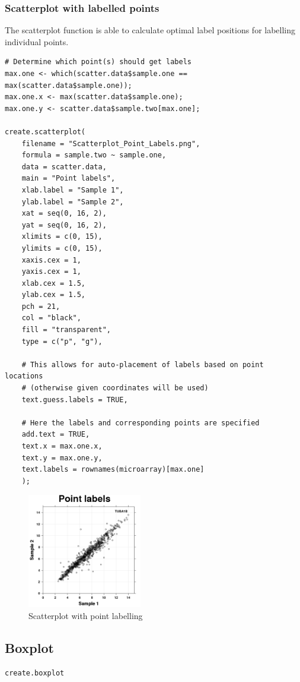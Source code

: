\documentclass[letterpaper]{article}
\begin{document}
\subsubsection{Scatterplot with labelled points}
The scatterplot function is able to calculate optimal label positions for labelling individual points. 
\begin{verbatim}
# Determine which point(s) should get labels
max.one <- which(scatter.data$sample.one == max(scatter.data$sample.one));
max.one.x <- max(scatter.data$sample.one);
max.one.y <- scatter.data$sample.two[max.one];

create.scatterplot(
    filename = "Scatterplot_Point_Labels.png",
    formula = sample.two ~ sample.one,
    data = scatter.data,
    main = "Point labels",
    xlab.label = "Sample 1",
    ylab.label = "Sample 2",
    xat = seq(0, 16, 2),
    yat = seq(0, 16, 2),
    xlimits = c(0, 15),
    ylimits = c(0, 15),
    xaxis.cex = 1,
    yaxis.cex = 1,
    xlab.cex = 1.5,
    ylab.cex = 1.5,
    pch = 21,
    col = "black",
    fill = "transparent",
    type = c("p", "g"),
    
    # This allows for auto-placement of labels based on point locations
    # (otherwise given coordinates will be used)
    text.guess.labels = TRUE,
    
    # Here the labels and corresponding points are specified
    add.text = TRUE,
    text.x = max.one.x,
    text.y = max.one.y,
    text.labels = rownames(microarray)[max.one]
    );
\end{verbatim}
\begin{figure}[!ht]
  \begin{center}
     \includegraphics[width=50mm]{Figures/Scatterplot_Point_Labels.png}
     \caption{Scatterplot with point labelling}
  \end{center}
\end{figure}

\subsection{Boxplot}
\begin{verbatim}
create.boxplot
\end{verbatim}
\end{document}
